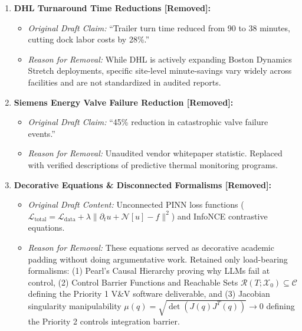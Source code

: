 \documentclass[11pt,a4paper]{article}
\begin{document}
\begin{enumerate}
    \item \textbf{DHL Turnaround Time Reductions [Removed]:}
    \begin{itemize}
        \item \textit{Original Draft Claim:} ``Trailer turn time reduced from 90 to 38 minutes, cutting dock labor costs by 28\%.''
        \item \textit{Reason for Removal:} While DHL is actively expanding Boston Dynamics Stretch deployments, specific site-level minute-savings vary widely across facilities and are not standardized in audited reports.
    \end{itemize}

    \item \textbf{Siemens Energy Valve Failure Reduction [Removed]:}
    \begin{itemize}
        \item \textit{Original Draft Claim:} ``45\% reduction in catastrophic valve failure events.''
        \item \textit{Reason for Removal:} Unaudited vendor whitepaper statistic. Replaced with verified descriptions of predictive thermal monitoring programs.
    \end{itemize}

    \item \textbf{Decorative Equations \& Disconnected Formalisms [Removed]:}
    \begin{itemize}
        \item \textit{Original Draft Content:} Unconnected PINN loss functions ($\mathcal{L}_{\text{total}} = \mathcal{L}_{\text{data}} + \lambda \|\partial_t u + \mathcal{N}[u] - f\|^2$) and InfoNCE contrastive equations.
        \item \textit{Reason for Removal:} These equations served as decorative academic padding without doing argumentative work. Retained only load-bearing formalisms: (1) Pearl's Causal Hierarchy proving why LLMs fail at control, (2) Control Barrier Functions and Reachable Sets $\mathcal{R}(T; \mathcal{X}_0) \subseteq \mathcal{C}$ defining the Priority 1 V\&V software deliverable, and (3) Jacobian singularity manipulability $\mu(q) = \sqrt{\det(J(q)J^T(q))} \to 0$ defining the Priority 2 controls integration barrier.
    \end{itemize}
\end{enumerate}
\end{document}
